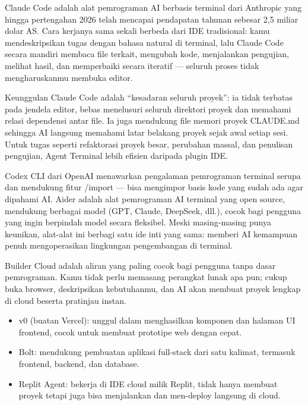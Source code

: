 
Claude Code adalah alat pemrograman AI berbasis terminal dari Anthropic yang hingga pertengahan 2026 telah mencapai pendapatan tahunan sebesar 2,5 miliar dolar AS. Cara kerjanya sama sekali berbeda dari IDE tradisional: kamu mendeskripsikan tugas dengan bahasa natural di terminal, lalu Claude Code secara mandiri membaca file terkait, mengubah kode, menjalankan pengujian, melihat hasil, dan memperbaiki secara iteratif — seluruh proses tidak mengharuskanmu membuka editor.

Keunggulan Claude Code adalah “kesadaran seluruh proyek”: ia tidak terbatas pada jendela editor, bebas menelusuri seluruh direktori proyek dan memahami relasi dependensi antar file. Ia juga mendukung file memori proyek CLAUDE.md sehingga AI langsung memahami latar belakang proyek sejak awal setiap sesi. Untuk tugas seperti refaktorasi proyek besar, perubahan massal, dan penulisan pengujian, Agent Terminal lebih efisien daripada plugin IDE.


Codex CLI dari OpenAI menawarkan pengalaman pemrograman terminal serupa dan mendukung fitur /import — bisa mengimpor basis kode yang sudah ada agar dipahami AI. Aider adalah alat pemrograman AI terminal yang open source, mendukung berbagai model (GPT, Claude, DeepSeek, dll.), cocok bagi pengguna yang ingin berpindah model secara fleksibel. Meski masing-masing punya keunikan, alat-alat ini berbagi satu ide inti yang sama: memberi AI kemampuan penuh mengoperasikan lingkungan pengembangan di terminal.


Builder Cloud adalah aliran yang paling cocok bagi pengguna tanpa dasar pemrograman. Kamu tidak perlu memasang perangkat lunak apa pun; cukup buka browser, deskripsikan kebutuhanmu, dan AI akan membuat proyek lengkap di cloud beserta pratinjau instan.

\begin{itemize}
  \item v0 (buatan Vercel): unggul dalam menghasilkan komponen dan halaman UI frontend, cocok untuk membuat prototipe web dengan cepat.
  \item Bolt: mendukung pembuatan aplikasi full-stack dari satu kalimat, termasuk frontend, backend, dan database.
  \item Replit Agent: bekerja di IDE cloud milik Replit, tidak hanya membuat proyek tetapi juga bisa menjalankan dan men-deploy langsung di cloud.
\end{itemize}

